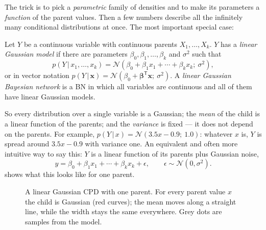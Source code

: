 \documentclass[11pt, oneside]{book}
\newcommand{\Prob}{\mathbb{P}}           %
\newcommand{\T}{^{\mathsf{T}}}           %
\newcommand{\Normal}{\mathcal{N}}
\newcommand{\given}{\,\vert\,}           %
\newcommand{\bx}{\mathbf{x}}  \newcommand{\by}{\mathbf{y}}
\begin{document}
The trick is to pick a \emph{parametric} family of densities and to make its
parameters a \emph{function} of the parent values. Then a few numbers describe
all the infinitely many conditional distributions at once. The most important
special case:

\begin{defbox}[title={Linear Gaussian model}]
Let $Y$ be a continuous variable with continuous parents $X_1, \ldots, X_k$.
$Y$ has a \emph{linear Gaussian model} if there are parameters
$\beta_0, \beta_1, \ldots, \beta_k$ and $\sigma^2$ such that
\[
p(Y \given x_1, \ldots, x_k) = \Normal(\beta_0 + \beta_1 x_1 + \cdots + \beta_k x_k;\ \sigma^2),
\]
or in vector notation $p(Y \given \bx) = \Normal(\beta_0 + \bm{\beta}\T \bx;\ \sigma^2)$.
A \emph{linear Gaussian Bayesian network} is a BN in which all variables are
continuous and all of them have linear Gaussian models.
\end{defbox}

So every distribution over a single variable is a Gaussian; the \emph{mean} of
the child is a linear function of the parents; and the \emph{variance} is
fixed --- it does not depend on the parents. For example, $p(Y \given x) =
\Normal(3.5x - 0.9;\ 1.0)$: whatever $x$ is, $Y$ is spread around $3.5x - 0.9$
with variance one. An equivalent and often more intuitive way to say this: $Y$
is a linear function of its parents plus Gaussian noise,
\[
y = \beta_0 + \beta_1 x_1 + \cdots + \beta_k x_k + \epsilon,
\qquad \epsilon \sim \Normal(0, \sigma^2).
\]
 shows what this looks like for one parent.

\begin{figure}[htbp]
\centering
{}
\caption{A linear Gaussian CPD with one parent. For every parent value $x$ the
child is Gaussian (red curves); the mean moves along a straight line, while the
width stays the same everywhere. Grey dots are samples from the model.}
\label{fig:linear-gaussian}
\end{figure}
\end{document}

